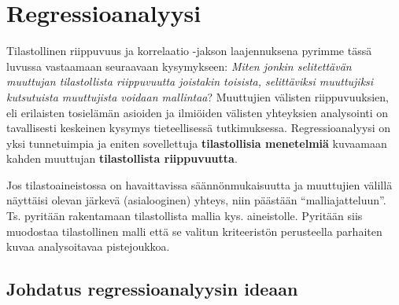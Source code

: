 \documentclass[
]{book}
\begin{document}

\hypertarget{luku10}{%
\chapter{Regressioanalyysi}\label{luku10}}

Tilastollinen riippuvuus ja korrelaatio -jakson laajennuksena pyrimme tässä luvussa vastaamaan seuraavaan kysymykseen: \emph{Miten jonkin selitettävän muuttujan tilastollista riippuvuutta joistakin toisista, selittäviksi muuttujiksi kutsutuista muuttujista voidaan mallintaa}? Muuttujien välisten riippuvuuksien, eli erilaisten tosielämän asioiden ja ilmiöiden välisten yhteyksien analysointi on tavallisesti keskeinen kysymys tieteellisessä tutkimuksessa. Regressioanalyysi on yksi tunnetuimpia ja eniten sovellettuja \textbf{tilastollisia menetelmiä} kuvaamaan kahden muuttujan \textbf{tilastollista riippuvuutta}.

Jos tilastoaineistossa on havaittavissa säännönmukaisuutta ja muuttujien välillä näyttäisi olevan järkevä (asialooginen) yhteys, niin päästään ``malliajatteluun''. Ts. pyritään rakentamaan tilastollista mallia kys. aineistolle. Pyritään siis muodostaa tilastollinen malli että se valitun kriteeristön perusteella parhaiten kuvaa analysoitavaa pistejoukkoa.

\hypertarget{alaluku10}{%
\section{Johdatus regressioanalyysin ideaan}\label{alaluku10}}
\end{document}
